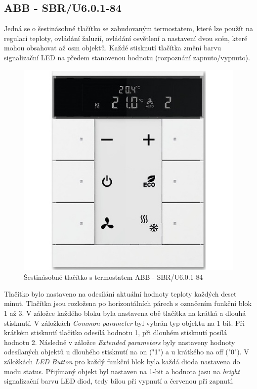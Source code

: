 \subsection{ABB - SBR/U6.0.1-84}
Jedná se o šestinásobné tlačítko se zabudovaným termostatem, které lze použít na regulaci teploty, ovládání žaluzií, ovládání osvětlení a nastavení dvou scén, které mohou obsahovat až osm objektů. Každé stisknutí tlačítka změní barvu signalizační LED na předem stanovenou hodnotu (rozpoznání zapnuto/vypnuto). \cite{ABB}

\begin{figure}[!ht]
  \begin{center}
    \includegraphics[scale=1.6]{obrazky/ABB.jpg}
  \end{center}
  \caption[Šestinásobné tlačítko s termostatem ABB - SBR/U6.0.1-84 \cite{ABB}]{Šestinásobné tlačítko s termostatem ABB - SBR/U6.0.1-84 \cite{ABB}}
  \label{fig:Šestinásobné tlačítko s termostatem ABB SBR/U6.0.1-84}
\end{figure}
Tlačítko bylo nastaveno na odesílání aktuální hodnoty teploty každých deset minut. Tlačítka jsou rozložena po horizontálních párech s označením funkční blok 1 až 3. V záložce každého bloku byla nastavena obě tlačítka na krátká a dlouhá stisknutí. V záložkách  \textit{Common parameter} byl vybrán typ objektu na 1-bit. Při krátkém stisknutí tlačítko odesílá hodnotu 1, při dlouhém stisknutí posílá hodnotu 2. Následně v záložce \textit{Extended parameters} byly nastaveny hodnoty odesílaných objektů u dlouhého stisknutí na on ("1") a u krátkého na off ("0").
V záložkách \textit{LED Button} pro každý funkční blok byla každá dioda nastavena do modu status. Přijímaný objekt byl nastaven na 1-bit a hodnota jasu na \textit{bright} signalizační barvu LED diod, tedy bílou při vypnutí a červenou při zapnutí. 
